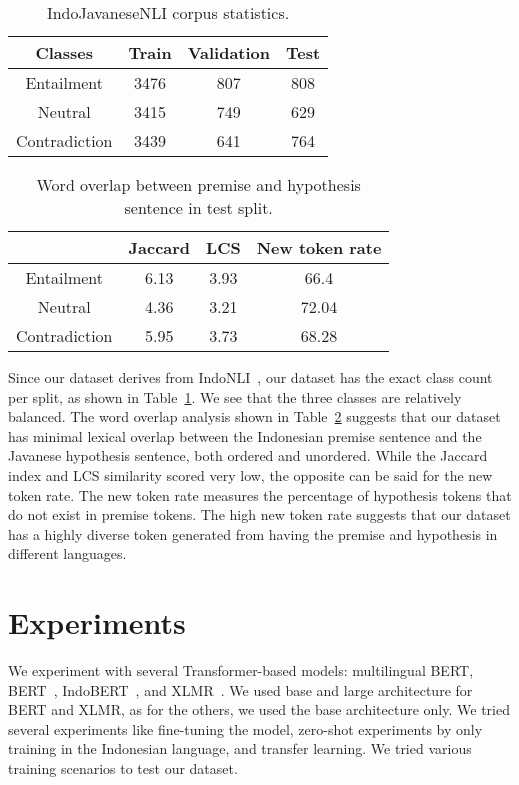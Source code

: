 \documentclass[a4paper, conference]{IEEEtran}
\begin{document}
\begin{table}[!t]
\begin{center}
\begin{tabular}{cccc}
\hline
\textbf{Classes} & \textbf{Train} & \textbf{Validation} & \textbf{Test} \\
\hline
Entailment & 3476 & 807 & 808 \\
Neutral & 3415 & 749 & 629 \\
Contradiction & 3439 & 641 & 764 \\
\hline
\end{tabular}
\captionsetup{labelformat=default}
\caption{IndoJavaneseNLI corpus statistics.}
\label{tblClasses}
\end{center}
\end{table}

\begin{table}[!t]
\begin{center}
\begin{tabular}{cccc}
\hline
 & \textbf{Jaccard} & \textbf{LCS} & \textbf{New token rate} \\
\hline
Entailment & 6.13 & 3.93 & 66.4 \\
Neutral & 4.36 & 3.21 & 72.04 \\
Contradiction & 5.95 & 3.73 & 68.28 \\
\hline
\end{tabular}
\captionsetup{labelformat=default}
\caption{Word overlap between premise and hypothesis sentence in test split.}
\label{tblWordOverlap}
\end{center}
\end{table}

Since our dataset derives from IndoNLI~\cite{Mahendra2021}, our dataset has the exact class count per split, as shown in Table~\ref{tblClasses}. We see that the three classes are relatively balanced. The word overlap analysis shown in Table~\ref{tblWordOverlap} suggests that our dataset has minimal lexical overlap between the Indonesian premise sentence and the Javanese hypothesis sentence, both ordered and unordered. While the Jaccard index and LCS similarity scored very low, the opposite can be said for the new token rate. The new token rate measures the percentage of hypothesis tokens that do not exist in premise tokens. The high new token rate suggests that our dataset has a highly diverse token generated from having the premise and hypothesis in different languages.

\section{Experiments}
We experiment with several Transformer-based models: multilingual BERT, BERT~\cite{Devlin2019}, IndoBERT~\cite{Wilie2020}, and XLMR~\cite{Conneau2020}. We used base and large architecture for BERT and XLMR, as for the others, we used the base architecture only. We tried several experiments like fine-tuning the model, zero-shot experiments by only training in the Indonesian language, and transfer learning. We tried various training scenarios to test our dataset.
\end{document}
